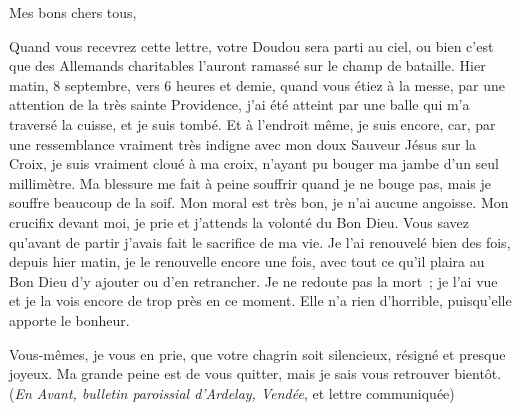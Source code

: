 \documentclass[french,twoside]{book} %
\newenvironment{quoteblock}%
  {\begin{quoting}}
  {\end{quoting}}
\newenvironment{quotebar}{%
    \def\FrameCommand{{\color{rubric!10!}\vrule width 0.5em} \hspace{0.9em}}%
    \def\OuterFrameSep{\itemsep} %
    \MakeFramed {\advance\hsize-\width \FrameRestore}
  }%
  {%
    \endMakeFramed
  }
\renewenvironment{quoteblock}%
  {%
    \savenotes
    \setstretch{0.9}
    \normalfont
    \begin{quotebar}
  }
  {%
    \end{quotebar}
    \spewnotes
  }
\begin{document}
\begin{quoteblock}
 \noindent Mes bons chers tous,\par
 Quand vous recevrez cette lettre, votre Doudou sera parti au ciel, ou bien c’est que des Allemands charitables l’auront ramassé sur le champ de bataille. Hier matin, 8 septembre, vers 6 heures et demie, quand vous étiez à la messe, par une attention de la très sainte Providence, j’ai été atteint par une balle qui m’a traversé la cuisse, et je suis tombé. Et à l’endroit même, je suis encore, car, par une ressemblance vraiment très indigne avec mon doux Sauveur Jésus sur la Croix, je suis vraiment cloué à ma croix, n’ayant pu bouger ma jambe d’un seul millimètre. Ma blessure me fait à peine souffrir quand je ne bouge pas, mais je souffre beaucoup de la soif. Mon moral est très bon, je n’ai aucune angoisse. Mon crucifix devant moi, je prie et j’attends la volonté du Bon Dieu. Vous savez qu’avant de partir j’avais fait le sacrifice de ma vie. Je l’ai renouvelé bien des fois, depuis hier matin, je le renouvelle encore une fois, avec tout ce qu’il plaira au Bon Dieu d’y ajouter ou d’en retrancher. Je ne redoute pas la mort ; je l’ai vue et je la vois encore de trop près en ce moment. Elle n’a rien d’horrible, puisqu’elle apporte le bonheur.‌\par
 Vous-mêmes, je vous en prie, que votre chagrin soit silencieux, résigné et presque joyeux. Ma grande peine est de vous quitter, mais je sais vous retrouver bientôt. ({\itshape En Avant, bulletin paroissial d’Ardelay, Vendée}, et lettre communiquée)‌
 \end{quoteblock}
\end{document}
